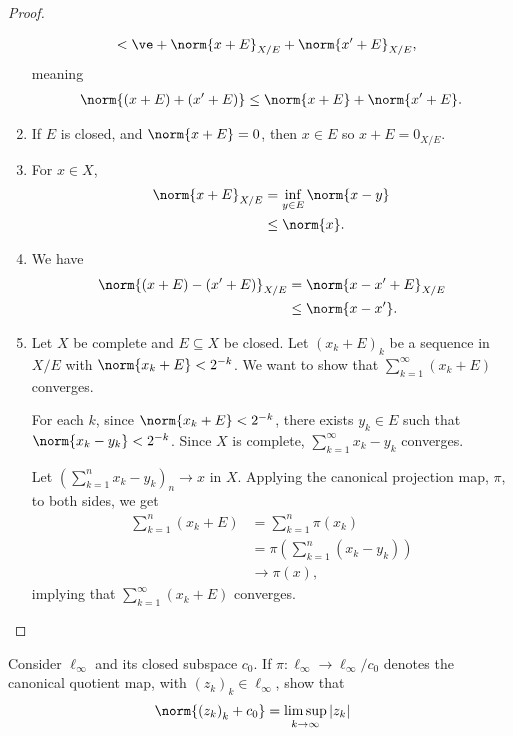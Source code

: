 \documentclass[10pt]{mypackage}
\begin{document}
\begin{proof}
\begin{enumerate}[(1)]
\begin{align*}
                                                    &< \ve + \norm{x + E}_{X/E} + \norm{x' + E}_{X/E},
    \end{align*}
    meaning
    \begin{align*}
      \norm{\left(x+E\right) + \left(x' + E\right)} \leq \norm{x + E} + \norm{x' + E}.
    \end{align*}
  \item If $E$ is closed, and $\norm{x + E} = 0$, then $x\in E$ so $x + E = 0_{X/E}$.
  \item For $x\in X$,
    \begin{align*}
      \norm{x + E}_{X/E} &= \inf_{y\in E}\norm{x-y}\\
                         &\leq \norm{x}.
    \end{align*}
  \item We have
    \begin{align*}
      \norm{\left(x+E\right) - \left(x' + E\right)}_{X/E} &= \norm{x-x' + E}_{X/E}\\
                                                          &\leq \norm{x-x'}.
    \end{align*}
  \item Let $X$ be complete and $E\subseteq X$ be closed. Let $\left(x_k + E\right)_k$ be a sequence in $X/E$ with $\norm{x_k + E} < 2^{-k}$. We want to show that $\sum_{k=1}^{\infty}\left(x_k + E\right)$ converges.\newline

    For each $k$, since $\norm{x_k + E} < 2^{-k}$, there exists $y_k\in E$ such that $\norm{x_k - y_k} < 2^{-k}$. Since $X$ is complete, $\sum_{k=1}^{\infty}x_k - y_k$ converges.\newline

    Let $\left(\sum_{k=1}^{n}x_k - y_k\right)_n \rightarrow x$ in $X$. Applying the canonical projection map, $\pi$, to both sides, we get
    \begin{align*}
      \sum_{k=1}^{n}\left(x_k + E\right) &= \sum_{k=1}^{n}\pi\left(x_k\right)\\
                                         &= \pi\left(\sum_{k=1}^{n}\left(x_k - y_k\right)\right)\\
                                         &\rightarrow \pi(x),
    \end{align*}
    implying that $\sum_{k=1}^{\infty}\left(x_k + E\right)$ converges.
  \end{enumerate}
\end{proof}
\begin{exercise}
  Consider $\ell_{\infty}$ and its closed subspace $c_0$. If $\pi: \ell_{\infty}\rightarrow \ell_{\infty}/c_0$ denotes the canonical quotient map, with $\left(z_k\right)_k\in \ell_{\infty}$, show that
  \begin{align*}
    \norm{\left(z_k\right)_k + c_0} &= \limsup_{k\rightarrow\infty}\left\vert z_k \right\vert
  \end{align*}
\end{exercise}
\end{document}
